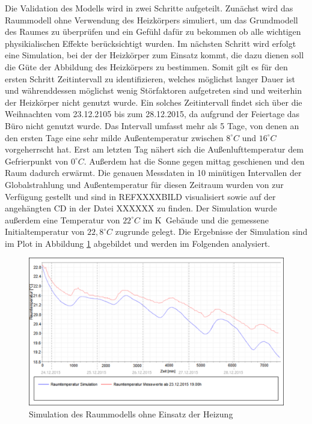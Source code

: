 Die Validation des Modells wird in zwei Schritte aufgeteilt. Zunächst wird das Raummodell ohne Verwendung des Heizkörpers simuliert, um das Grundmodell des Raumes zu überprüfen und ein Gefühl dafür zu bekommen ob alle wichtigen physikialischen Effekte berücksichtigt wurden. Im nächsten Schritt wird erfolgt eine Simulation, bei der der Heizkörper zum Einsatz kommt, die dazu dienen soll die Güte der Abbildung des Heizkörpers zu bestimmen.
Somit gilt es für den ersten Schritt Zeitintervall zu identifizieren, welches möglichst langer Dauer ist und währenddessen möglichst wenig Störfaktoren aufgetreten sind und weiterhin der Heizkörper nicht genutzt wurde. Ein solches Zeitintervall findet sich über die Weihnachten vom 23.12.2105 bis zum 28.12.2015, da aufgrund der Feiertage das Büro nicht genutzt wurde.
Das Intervall umfasst mehr als 5 Tage, von denen an den ersten Tage eine sehr milde Außentemperatur zwischen $8^{\circ}C$ und $16^{\circ}C$ vorgeherrscht hat. Erst am letzten Tag nähert sich die Außenlufttemperatur dem Gefrierpunkt von $0^{\circ}C$. Außerdem hat die Sonne gegen mittag geschienen und den Raum dadurch erwärmt.
Die genauen Messdaten in 10 minütigen Intervallen der Globalstrahlung und Außentemperatur für diesen Zeitraum wurden von \cite{wetter} zur Verfügung gestellt und sind in REFXXXXBILD visualisiert sowie auf der angehängten CD in der Datei XXXXXX zu finden.
Der Simulation wurde außerdem eine Temperatur von $22^{\circ}C$ im K~Gebäude und die gemessene Initialtemperatur von $22,8^{\circ}C$ zugrunde gelegt. Die Ergebnisse der Simulation sind im Plot in Abbildung \ref{fig:valid1} abgebildet und werden im Folgenden analysiert.

\begin{figure}
\centering
\includegraphics[width=\textwidth]{abbildungen/20160328_validierung1}
\caption{Simulation des Raummodells ohne Einsatz der Heizung}
\label{fig:valid1}
\end{figure}

